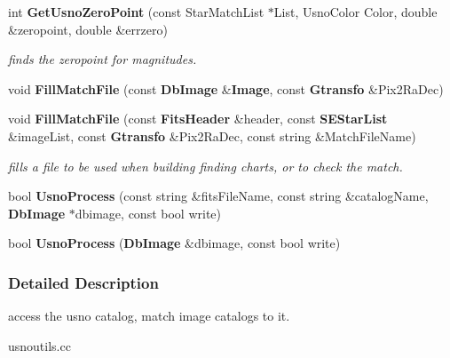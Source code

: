 \begin{CompactItemize}
\item 
int {\bf Get\-Usno\-Zero\-Point} (const Star\-Match\-List $\ast$List, Usno\-Color Color, double \&zeropoint, double \&errzero)
\begin{CompactList}\small\item\em finds the zeropoint for magnitudes.\item\end{CompactList}\item 
{}
void {\bf Fill\-Match\-File} (const {\bf Db\-Image} \&{\bf Image}, const {\bf Gtransfo} \&Pix2Ra\-Dec)\label{usnoutils_h_a8}

\item 
{}
void {\bf Fill\-Match\-File} (const {\bf Fits\-Header} \&header, const {\bf SEStar\-List} \&image\-List, const {\bf Gtransfo} \&Pix2Ra\-Dec, const string \&Match\-File\-Name)\label{usnoutils_h_a9}

\begin{CompactList}\small\item\em fills a file to be used when building finding charts, or to check the match.\item\end{CompactList}\item 
{}
bool {\bf Usno\-Process} (const string \&fits\-File\-Name, const string \&catalog\-Name, {\bf Db\-Image} $\ast$dbimage, const bool write)\label{usnoutils_h_a10}

\item 
{}
bool {\bf Usno\-Process} ({\bf Db\-Image} \&dbimage, const bool write)\label{usnoutils_h_a11}

\end{CompactItemize}


\subsubsection{Detailed Description}
access the usno catalog, match image catalogs to it.

 usnoutils.cc




